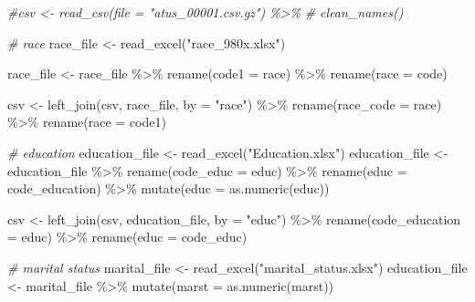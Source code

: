 \documentclass[
]{article}
\newenvironment{Shaded}{\begin{snugshade}}{\end{snugshade}}
\newcommand{\AttributeTok}[1]{\textcolor[rgb]{0.77,0.63,0.00}{#1}}
\newcommand{\CommentTok}[1]{\textcolor[rgb]{0.56,0.35,0.01}{\textit{#1}}}
\newcommand{\FunctionTok}[1]{\textcolor[rgb]{0.00,0.00,0.00}{#1}}
\newcommand{\NormalTok}[1]{#1}
\newcommand{\OtherTok}[1]{\textcolor[rgb]{0.56,0.35,0.01}{#1}}
\newcommand{\SpecialCharTok}[1]{\textcolor[rgb]{0.00,0.00,0.00}{#1}}
\newcommand{\StringTok}[1]{\textcolor[rgb]{0.31,0.60,0.02}{#1}}
\begin{document}
\begin{Shaded}
\begin{Highlighting}[]
\CommentTok{\#csv \textless{}{-} read\_csv(file = "atus\_00001.csv.gz") \%\textgreater{}\%}
 \CommentTok{\# clean\_names()}

\CommentTok{\# race }
\NormalTok{race\_file }\OtherTok{\textless{}{-}} \FunctionTok{read\_excel}\NormalTok{(}\StringTok{"race\_980x.xlsx"}\NormalTok{)}

\NormalTok{race\_file }\OtherTok{\textless{}{-}}\NormalTok{ race\_file }\SpecialCharTok{\%\textgreater{}\%}
  \FunctionTok{rename}\NormalTok{(}\AttributeTok{code1 =}\NormalTok{ race) }\SpecialCharTok{\%\textgreater{}\%}
  \FunctionTok{rename}\NormalTok{(}\AttributeTok{race =}\NormalTok{ code) }

\NormalTok{csv }\OtherTok{\textless{}{-}} \FunctionTok{left\_join}\NormalTok{(csv, race\_file, }\AttributeTok{by =} \StringTok{"race"}\NormalTok{) }\SpecialCharTok{\%\textgreater{}\%}
  \FunctionTok{rename}\NormalTok{(}\AttributeTok{race\_code =}\NormalTok{ race) }\SpecialCharTok{\%\textgreater{}\%}
  \FunctionTok{rename}\NormalTok{(}\AttributeTok{race =}\NormalTok{ code1)}


\CommentTok{\# education}
\NormalTok{education\_file }\OtherTok{\textless{}{-}} \FunctionTok{read\_excel}\NormalTok{(}\StringTok{"Education.xlsx"}\NormalTok{)}
\NormalTok{education\_file }\OtherTok{\textless{}{-}}\NormalTok{ education\_file }\SpecialCharTok{\%\textgreater{}\%}
  \FunctionTok{rename}\NormalTok{(}\AttributeTok{code\_educ =}\NormalTok{ educ) }\SpecialCharTok{\%\textgreater{}\%}
  \FunctionTok{rename}\NormalTok{(}\AttributeTok{educ =}\NormalTok{ code\_education) }\SpecialCharTok{\%\textgreater{}\%}
  \FunctionTok{mutate}\NormalTok{(}\AttributeTok{educ =} \FunctionTok{as.numeric}\NormalTok{(educ))}

\NormalTok{csv }\OtherTok{\textless{}{-}} \FunctionTok{left\_join}\NormalTok{(csv, education\_file, }\AttributeTok{by =} \StringTok{"educ"}\NormalTok{) }\SpecialCharTok{\%\textgreater{}\%}
  \FunctionTok{rename}\NormalTok{(}\AttributeTok{code\_education =}\NormalTok{ educ) }\SpecialCharTok{\%\textgreater{}\%}
  \FunctionTok{rename}\NormalTok{(}\AttributeTok{educ =}\NormalTok{ code\_educ) }

\CommentTok{\# marital status}
\NormalTok{marital\_file }\OtherTok{\textless{}{-}} \FunctionTok{read\_excel}\NormalTok{(}\StringTok{"marital\_status.xlsx"}\NormalTok{)}
\NormalTok{education\_file }\OtherTok{\textless{}{-}}\NormalTok{ marital\_file }\SpecialCharTok{\%\textgreater{}\%}
  \FunctionTok{mutate}\NormalTok{(}\AttributeTok{marst =} \FunctionTok{as.numeric}\NormalTok{(marst))}
  

\end{Highlighting}
\end{Shaded}
\end{document}

